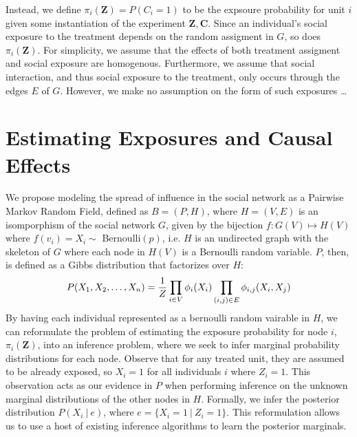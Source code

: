 \documentclass{article}
\begin{document}
Instead, we define $\pi_i(\mathbf{Z}) = P(C_i = 1)$ to be the expsoure probability for unit $i$ given some instantiation of the experiment $\mathbf{Z}, \mathbf{C}$. Since an individual's social exposure to the treatment depends on the random assigment in $G$, so does $\pi_i(\mathbf{Z})$. For simplicity, we assume that
the effects of both treatment assigment and social exposure are homogenous. Furthermore, we assume that social interaction, and thus social exposure to the treatment, only occurs through the edges $E$ of $G$. However, we make no assumption on the form of such exposures \dots

\section{Estimating Exposures and Causal Effects}

We propose modeling the spread of influence in the social network as a Pairwise Markov Random Field, defined as $B = (P, H)$, where $H = (V, E)$ is an isomporphism of the social network $G$, given by the bijection $f: G(V) \mapsto H(V)$ where $f(v_i) = X_i \sim $ Bernoulli$(p)$, i.e. $H$ is an undirected graph with the skeleton of $G$ where each node in $H(V)$ is a Bernoulli random variable. 
$P$, then, is defined as a Gibbs distribution that factorizes over $H$: \\
\begin{displaymath}
  P(X_1, X_2, \dots, X_n) = \frac{1}{Z}\prod_{i \in V} \phi_i(X_i)\prod_{(i, j) \in E}\phi_{i,j}(X_i, X_j) \\[0.5ex]
\end{displaymath}
By having each individual represented as a bernoulli random vairable in $H$, we can reformulate the problem of estimating the exposure probability for node $i$,  $\pi_i(\mathbf{Z})$, into 
an inference problem, where we seek to infer marginal probability distributions for each node. Observe that for any treated unit, they are assumed to be already exposed, so $X_i = 1$ for all individuals $i$ where $Z_i = 1$. 
This observation acts as our evidence in $P$ when performing inference on the unknown marginal distributions of the other nodes in $H$. Formally, we infer the posterior distribution $P(X_i\ |\ e)$, where $e = \{X_i = 1\ |\ Z_i = 1\}$. 
This reformulation allows us to use a host of existing inference algorithms to learn the posterior marginals. 



\end{document}
